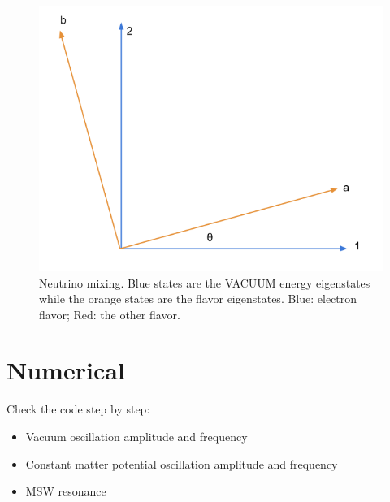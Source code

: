 \documentclass{sciposter}
\begin{document}
\begin{multicols}{3}
\begin{figure}
\centering
\includegraphics[width=\columnwidth]{assets/neutrinoMixingAngle.png}
\caption{Neutrino mixing. Blue states are the VACUUM energy eigenstates while the orange states are the flavor eigenstates. Blue: electron flavor; Red: the other flavor.}
\label{fig:neutrinoMixingAngle}
\end{figure}





\section{Numerical}
Check the code step by step:

\begin{itemize}
\item Vacuum oscillation amplitude and frequency
\item Constant matter potential oscillation amplitude and frequency
\item MSW resonance
\end{itemize}




\end{multicols}
\end{document}
